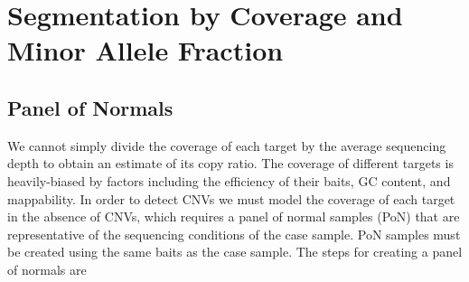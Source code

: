 \documentclass[nofootinbib,amssymb,amsmath]{revtex4}
\begin{document}
\section{Segmentation by Coverage and Minor Allele Fraction} \label{recapseg-overview}

\subsection{Panel of Normals}
We cannot simply divide the coverage of each target by the average sequencing depth to obtain an estimate of its copy ratio.  The coverage of different targets is heavily-biased by factors including the efficiency of their baits, GC content, and mappability.  In order to detect CNVs we must model the coverage of each target in the absence of CNVs, which requires a panel of normal samples (PoN) that are representative of the sequencing conditions of the case sample.  PoN samples must be created using the same baits as the case sample.  The steps for creating a panel of normals are
\end{document}
